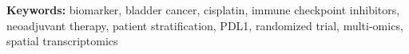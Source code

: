 \vspace{1.8cm}

\textbf{Keywords:} biomarker, bladder cancer, cisplatin, immune checkpoint inhibitors, neoadjuvant
therapy, patient stratification, PDL1, randomized trial, multi-omics, spatial transcriptomics





